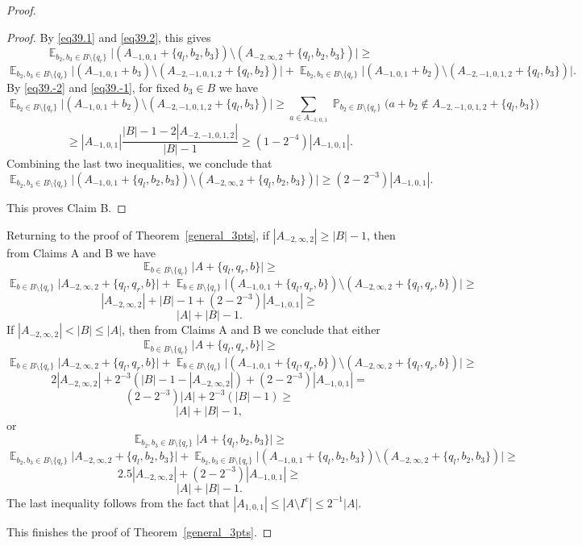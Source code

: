 \documentclass[12pt,reqno]{amsart}
\DeclareMathOperator*{\E}{\mathbb{E}}
\DeclareMathOperator*{\Prob}{\mathbb{P}}
\theoremstyle{definition}
\renewcommand\leq{\leqslant}
\renewcommand\geq{\geqslant}
\renewcommand\ge{\geqslant}
\begin{document}
\begin{proof}
\begin{proof}
\vspace{5pt}
By \eqref{eq39.1} and \eqref{eq39.2}, this gives
\[
\E_{b_2,b_3\in B \setminus \{q_r\}}\bigg|(A_{-1,0,1}+\{q_l,b_2, b_3\}) \setminus ( A_{-2,\infty,2}+\{q_l,b_2, b_3\} ) \bigg|\ge
\]
\[
\E_{b_2, b_3\in B \setminus \{q_r\}}\bigg|(A_{-1,0,1}+b_3) \setminus  (A_{-2,-1,0,1,2}+\{q_l, b_2\})\bigg|+ \E_{b_2, b_3\in B \setminus \{q_r\}}\bigg|(A_{-1,0,1}+b_2) \setminus  (A_{-2,-1,0,1,2}+\{q_l, b_3\})\bigg|.
\]
By \eqref{eq39.-2} and \eqref{eq39.-1}, for fixed $b_3\in B$ we have
\[
        \E_{b_2\in B \setminus \{q_r\}}\bigg|(A_{-1,0,1}+b_2) \setminus  (A_{-2,-1,0,1,2}+\{q_l,b_3\})\bigg| \geq \sum_{a\in A_{-1,0,1}} \Prob_{b_2\in B \setminus \{q_r\}} \bigg(a+b_2 \not\in A_{-2,-1,0,1,2}+\{q_l,b_3\} \bigg)
\]
\[
        \geq |A_{-1,0,1}| \frac{|B|-1-2|A_{-2,-1,0,1,2}|}{|B|-1}
        \geq (1-2^{-4})|A_{-1,0,1}|.
\]
Combining the last two inequalities, we conclude that
\[
\E_{b_2,b_3\in B \setminus \{q_r\}}\bigg|(A_{-1,0,1}+\{q_l,b_2, b_3\}) \setminus ( A_{-2,\infty,2}+\{q_l,b_2, b_3\} ) \bigg| \geq (2-2^{-3})|A_{-1,0,1}|.
\]

\vspace{5pt}
This proves Claim B.
\end{proof}

\vspace{7pt}
Returning to the proof of Theorem~\ref{general_3pts},
if $|A_{-2,\infty,2}|\geq |B|-1$, then from Claims A and B we have
$$\E_{b \in B \setminus \{q_r\}} \bigg| A+\{q_l, q_r,b\} \bigg| \geq $$ $$\E_{b\in B \setminus \{q_r\}}\bigg|A_{-2,\infty,2}+\{q_l,q_r, b\} \bigg|+ \E_{b\in B \setminus \{q_r\}}\bigg|(A_{-1,0,1}+\{q_l,q_r, b\}) \setminus ( A_{-2,\infty,2}+\{q_l,q_r, b\} ) \bigg| \geq$$
$$  |A_{-2,\infty,2}|+|B|-1+(2-2^{-3})|A_{-1,0,1}|\geq $$
$$|A|+|B|-1.$$
If $|A_{-2,\infty,2}|< |B| \leq |A|$, then from Claims A and B we conclude that either
$$\E_{b \in B \setminus \{q_r\}} \bigg| A+\{q_l, q_r,b\} \bigg| \geq $$ $$\E_{b\in B \setminus \{q_r\}}\bigg|A_{-2,\infty,2}+\{q_l,q_r, b\} \bigg|+ \E_{b\in B \setminus \{q_r\}}\bigg|(A_{-1,0,1}+\{q_l,q_r, b\}) \setminus ( A_{-2,\infty,2}+\{q_l,q_r, b\} ) \bigg| \geq$$
$$2|A_{-2,\infty,2}| +2^{-3}(|B|-1-|A_{-2,\infty,2}|)+(2-2^{-3})|A_{-1,0,1}| = $$
$$(2-2^{-3})|A|+2^{-3}(|B|-1) \geq$$
$$|A|+|B|-1,$$
or
$$\E_{b_2,b_3 \in B \setminus \{q_r\}} \bigg| A+\{q_l, b_2,b_3\} \bigg| \geq $$
$$\E_{b_2,b_3\in B \setminus \{q_r\}}\bigg|A_{-2,\infty,2}+\{q_l,b_2, b_3\} \bigg|+ \E_{b_2,b_3\in B \setminus \{q_r\}}\bigg|(A_{-1,0,1}+\{q_l,b_2, b_3\}) \setminus ( A_{-2,\infty,2}+\{q_l,b_2, b_3\} ) \bigg| \geq$$
$$2.5|A_{-2,\infty,2}|+(2-2^{-3})|A_{-1,0,1}| \geq $$
$$|A|+|B|-1.$$
The last inequality follows from the fact that $|A_{1,0,1}|  \leq |A\setminus I^c| \leq  2^{-1}|A|$.

\vspace{5pt}
This finishes the proof of Theorem~\ref{general_3pts}.
\end{proof}
\end{document}
